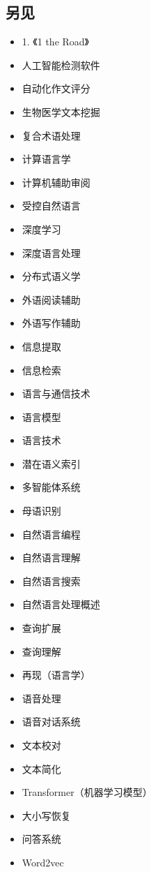 \subsection{另见}  
\begin{itemize}
\item 1. 《1 the Road》  
\item 人工智能检测软件  
\item 自动化作文评分  
\item 生物医学文本挖掘  
\item 复合术语处理  
\item 计算语言学  
\item 计算机辅助审阅  
\item 受控自然语言  
\item 深度学习  
\item 深度语言处理  
\item 分布式语义学  
\item 外语阅读辅助  
\item 外语写作辅助  
\item 信息提取  
\item 信息检索  
\item 语言与通信技术  
\item 语言模型  
\item 语言技术  
\item 潜在语义索引  
\item 多智能体系统  
\item 母语识别  
\item 自然语言编程  
\item 自然语言理解  
\item 自然语言搜索  
\item 自然语言处理概述  
\item 查询扩展  
\item 查询理解  
\item 再现（语言学）  
\item 语音处理  
\item 语音对话系统  
\item 文本校对  
\item 文本简化  
\item Transformer（机器学习模型）  
\item 大小写恢复  
\item 问答系统  
\item Word2vec
\end{itemize}
